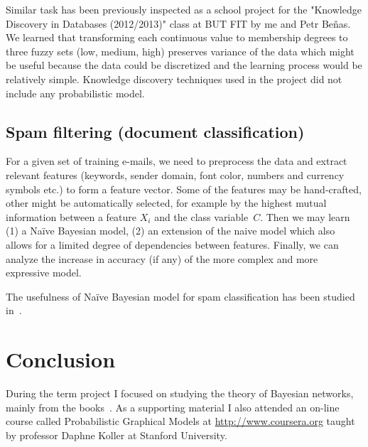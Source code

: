 \documentclass[english,cover]{fitthesis} %
\newcommand{\todo}[1]{{\color{red}#1}}
\begin{document}
Similar task has been previously inspected as a school project for the "Knowledge Discovery in Databases (2012/2013)" class at BUT FIT by me and Petr Beňas. We learned that transforming each continuous value to membership degrees to three fuzzy sets (low, medium, high) preserves variance of the data which might be useful because the data could be discretized and the learning process would be relatively simple. Knowledge discovery techniques used in the project did not include any probabilistic model.


\section{Spam filtering (document classification)}
For a given set of training e-mails, we need to preprocess the data and extract relevant features (keywords, sender domain, font color, numbers and currency symbols etc.) to form a feature vector. Some of the features may be hand-crafted, other might be automatically selected, for example by the highest mutual information between a feature $X_i$ and the class variable~$C$. Then we may learn (1) a Naïve Bayesian model, (2) an extension of the naive model which also allows for a limited degree of dependencies between features. Finally, we can analyze the increase in accuracy (if any) of the more complex and more expressive model.

The usefulness of Naïve Bayesian model for spam classification has been studied in~\cite{heckerman98_spam}.

\chapter{Conclusion}
During the term project I focused on studying the theory of Bayesian networks, mainly from the books~\cite{pgm,russell_norvig_ed2}. As a supporting material I also attended an on-line course called Probabilistic Graphical Models at \url{http://www.coursera.org} taught by professor Daphne Koller at Stanford University.
\end{document}
